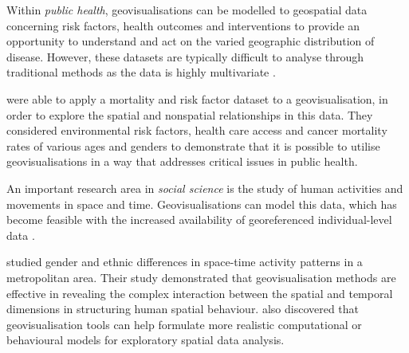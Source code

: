 \documentclass[
	fontsize=11pt
	headlines=2,
	footlines=2,
	parskip=half
]{scrartcl}
\begin{document}
{{			%
			Within \emph{public health}, geovisualisations can be modelled to geospatial data concerning risk factors, health outcomes and interventions to provide an opportunity to understand and act on the varied geographic distribution of disease. However, these datasets are typically difficult to analyse through traditional methods as the data is highly multivariate \parencite{maceachren2004geovisualization}.

			\textcite{maceachren2004geovisualization} were able to apply a mortality and risk factor dataset to a geovisualisation, in order to explore the spatial and nonspatial relationships in this data. They considered environmental risk factors, health care access and cancer mortality rates of various ages and genders to demonstrate that it is possible to utilise geovisualisations in a way that addresses critical issues in public health.

			An important research area in \emph{social science} is the study of human activities and movements in space and time. Geovisualisations can model this data, which has become feasible with the increased availability of georeferenced individual-level data \parencite{kwan2004geovisualization}.

			\textcite{kwan2004geovisualization} studied gender and ethnic differences in space-time activity patterns in a metropolitan area. Their study demonstrated that geovisualisation methods are effective in revealing the complex interaction between the spatial and temporal dimensions in structuring human spatial behaviour. \citeauthor{kwan2004geovisualization} also discovered that geovisualisation tools can help formulate more realistic computational or behavioural models for exploratory spatial data analysis.

		}



}
\end{document}
